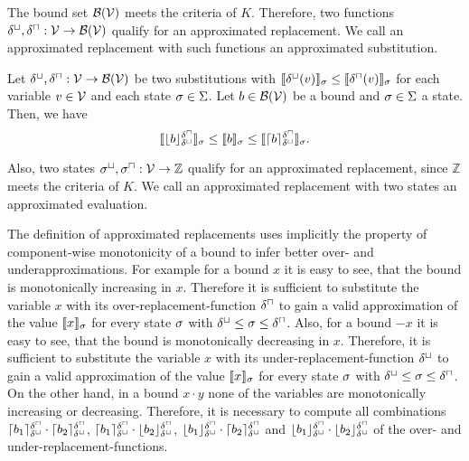 The bound set $\mathcal{B}(\mathcal{V})$ meets the criteria of $K$.
Therefore, two functions $\delta^\sqcup, \delta^\sqcap: \mathcal{V} \rightarrow \mathcal{B}(\mathcal{V})$ qualify for an approximated replacement.
We call an approximated replacement with such functions an approximated substitution.


\begin{theorem}
  Let $\delta^\sqcup, \delta^\sqcap: \mathcal{V} \rightarrow \mathcal{B}(\mathcal{V})$ be two substitutions with $\llbracket \delta^\sqcup(v) \rrbracket_{\sigma} \leq \llbracket \delta^\sqcap(v) \rrbracket_{\sigma}$ for each variable $v \in \mathcal{V}$ and each state $\sigma \in \Sigma$.
  Let $b \in \mathcal{B}(\mathcal{V})$ be a bound and $\sigma \in \Sigma$ a state.
  Then, we have
  \[ \llbracket \lfloor b \rfloor^{\delta^\sqcap}_{\delta^\sqcup} \rrbracket_{\sigma} \leq \llbracket b \rrbracket_{\sigma} \leq \llbracket \lceil b \rceil^{\delta^\sqcap}_{\delta^\sqcup} \rrbracket_{\sigma}. \]
\end{theorem}

Also, two states ${\sigma^\sqcup}, {\sigma^\sqcap}: \mathcal{V} \rightarrow \mathbb{Z}$ qualify for an approximated replacement, since $\mathbb{Z}$ meets the criteria of $K$.
We call an approximated replacement with two states an approximated evaluation.



The definition of approximated replacements uses implicitly the property of component-wise monotonicity of a bound to infer better over- and underapproximations.
For example for a bound $x$ it is easy to see, that the bound is monotonically increasing in $x$.
Therefore it is sufficient to substitute the variable $x$ with its over-replacement-function $\delta^\sqcap$ to gain a valid approximation of the value $\llbracket x \rrbracket_{\sigma}$ for every state $\sigma$ with $\delta^\sqcup \leq \sigma \leq \delta^\sqcap$.
Also, for a bound $-x$ it is easy to see, that the bound is monotonically decreasing in $x$.
Therefore, it is sufficient to substitute the variable $x$ with its under-replacement-function $\delta^\sqcup$ to gain a valid approximation of the value $\llbracket x \rrbracket_{\sigma}$ for every state $\sigma$ with $\delta^\sqcup \leq \sigma \leq \delta^\sqcap$.
On the other hand, in a bound $x \cdot y$ none of the variables are monotonically increasing or decreasing.
Therefore, it is necessary to compute all combinations $\lceil b_1 \rceil^{\delta^\sqcap}_{\delta^\sqcup} \cdot \lceil b_2 \rceil^{\delta^\sqcap}_{\delta^\sqcup}$, $\lceil b_1 \rceil^{\delta^\sqcap}_{\delta^\sqcup} \cdot \lfloor b_2 \rfloor^{\delta^\sqcap}_{\delta^\sqcup}$, $\lfloor b_1 \rfloor^{\delta^\sqcap}_{\delta^\sqcup} \cdot \lceil b_2 \rceil^{\delta^\sqcap}_{\delta^\sqcup}$ and $\lfloor b_1 \rfloor^{\delta^\sqcap}_{\delta^\sqcup} \cdot \lfloor b_2 \rfloor^{\delta^\sqcap}_{\delta^\sqcup}$ of the over- and under-replacement-functions.


